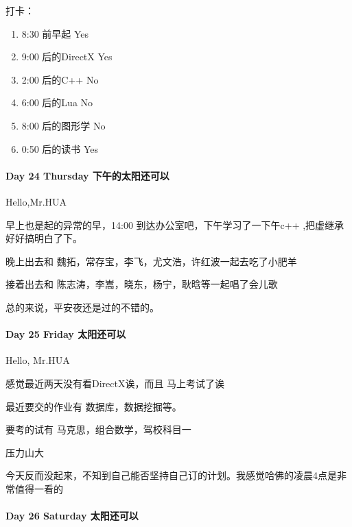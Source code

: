 \documentclass[UTF8,a4paper,8pt]{ctexart}
\begin{document}
            打卡： 
            \begin{enumerate}[fullwidth,itemindent=2em,label=(\arabic*)]
            	\item  8:30 前早起 \quad  Yes
            	\item  9:00 后的DirectX \quad Yes
            	\item  2:00 后的C++ \quad No
            	\item  6:00 后的Lua  \quad No
            	\item  8:00 后的图形学 \quad No
            	\item  0:50 后的读书 \quad Yes
            \end{enumerate}
       \paragraph{Day 24 Thursday  \quad 下午的太阳还可以}
        
        Hello,Mr.HUA
        
        早上也是起的异常的早，14:00 到达办公室吧，下午学习了一下午c++ ,把虚继承好好搞明白了下。
        
        晚上出去和 魏拓，常存宝，李飞，尤文浩，许红波一起去吃了小肥羊
        
        接着出去和 陈志涛，李嵩，晓东，杨宁，耿晗等一起唱了会儿歌
        
        总的来说，平安夜还是过的不错的。
        
       \paragraph{Day 25 Friday  \quad 太阳还可以}
       
       Hello, Mr.HUA
       
       感觉最近两天没有看DirectX诶，而且 马上考试了诶
       
       最近要交的作业有 数据库，数据挖掘等。
       
       要考的试有 马克思，组合数学，驾校科目一
       
       压力山大
       
       今天反而没起来，不知到自己能否坚持自己订的计划。我感觉哈佛的凌晨4点是非常值得一看的
        
        
         \paragraph{Day 26 Saturday  \quad 太阳还可以}
         
\end{document}
